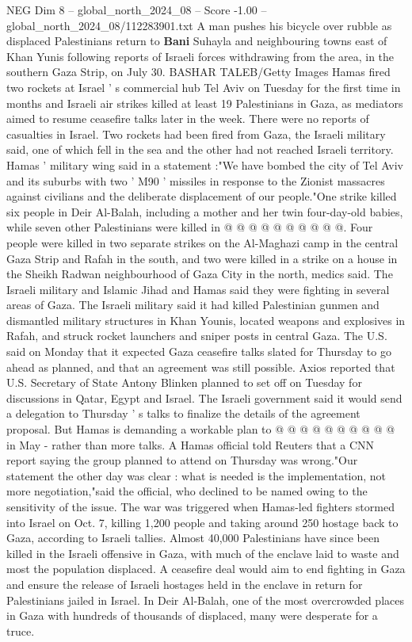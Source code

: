 \begin{textsample}{NEG Dim 8 – global\_north\_2024\_08 – Score -1.00 – global\_north\_2024\_08/112283901.txt}  \label{ex:f8_neg_422}
A man pushes his bicycle over rubble as displaced Palestinians return to \textbf{Bani} Suhayla and neighbouring towns east of Khan Yunis following reports of Israeli forces withdrawing from the area, in the southern Gaza Strip, on July 30.
BASHAR TALEB/Getty Images Hamas fired two rockets at Israel ' s commercial hub Tel Aviv on Tuesday for the first time in months and Israeli air strikes killed at least 19 Palestinians in Gaza, as mediators aimed to resume ceasefire talks later in the week.
There were no reports of casualties in Israel.
Two rockets had been fired from Gaza, the Israeli military said, one of which fell in the sea and the other had not reached Israeli territory.
Hamas ' military wing said in a statement :"We have bombed the city of Tel Aviv and its suburbs with two ' M90 ' missiles in response to the Zionist massacres against civilians and the deliberate displacement of our people."One strike killed six people in Deir Al-Balah, including a mother and her twin four-day-old babies, while seven other Palestinians were killed in @ @ @ @ @ @ @ @ @ @.
Four people were killed in two separate strikes on the Al-Maghazi camp in the central Gaza Strip and Rafah in the south, and two were killed in a strike on a house in the Sheikh Radwan neighbourhood of Gaza City in the north, medics said.
The Israeli military and Islamic Jihad and Hamas said they were fighting in several areas of Gaza.
The Israeli military said it had killed Palestinian gunmen and dismantled military structures in Khan Younis, located weapons and explosives in Rafah, and struck rocket launchers and sniper posts in central Gaza.
The U.S. said on Monday that it expected Gaza ceasefire talks slated for Thursday to go ahead as planned, and that an agreement was still possible.
Axios reported that U.S.
Secretary of State Antony Blinken planned to set off on Tuesday for discussions in Qatar, Egypt and Israel.
The Israeli government said it would send a delegation to Thursday ' s talks to finalize the details of the agreement proposal.
But Hamas is demanding a workable plan to @ @ @ @ @ @ @ @ @ @ in May - rather than more talks.
A Hamas official told Reuters that a CNN report saying the group planned to attend on Thursday was wrong."Our statement the other day was clear : what is needed is the implementation, not more negotiation,"said the official, who declined to be named owing to the sensitivity of the issue.
The war was triggered when Hamas-led fighters stormed into Israel on Oct. 7, killing 1,200 people and taking around 250 hostage back to Gaza, according to Israeli tallies.
Almost 40,000 Palestinians have since been killed in the Israeli offensive in Gaza, with much of the enclave laid to waste and most the population displaced.
A ceasefire deal would aim to end fighting in Gaza and ensure the release of Israeli hostages held in the enclave in return for Palestinians jailed in Israel.
In Deir Al-Balah, one of the most overcrowded places in Gaza with hundreds of thousands of displaced, many were desperate for a truce.

\end{textsample}
